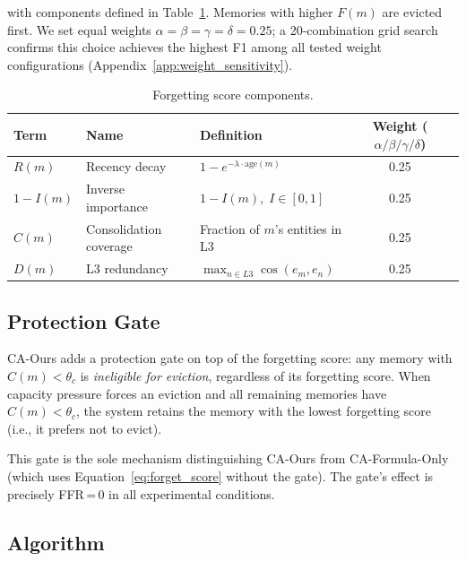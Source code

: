 \documentclass{article}
\begin{document}
with components defined in Table~\ref{tab:forgetting_components}.  Memories
with higher $F(m)$ are evicted first.  We set equal weights
$\alpha\!=\!\beta\!=\!\gamma\!=\!\delta\!=\!0.25$; a 20-combination grid
search confirms this choice achieves the highest F1 among all tested weight
configurations (Appendix~\ref{app:weight_sensitivity}).

\begin{table}[h]
\centering
\caption{Forgetting score components.}
\label{tab:forgetting_components}
\begin{tabular}{lllcc}
\toprule
Term & Name & Definition & Weight ($\alpha/\beta/\gamma/\delta$) \\
\midrule
$R(m)$ & Recency decay    & $1 - e^{-\lambda \cdot \text{age}(m)}$ & 0.25 \\
$1-I(m)$ & Inverse importance & $1 - I(m),\; I \in [0,1]$           & 0.25 \\
$C(m)$ & Consolidation coverage & Fraction of $m$'s entities in L3   & 0.25 \\
$D(m)$ & L3 redundancy  & $\max_{n \in L3} \cos(e_m, e_n)$        & 0.25 \\
\bottomrule
\end{tabular}
\end{table}

\subsection{Protection Gate}

CA-Ours adds a protection gate on top of the forgetting score: any memory
with $C(m) < \theta_c$ is \emph{ineligible for eviction}, regardless of
its forgetting score.  When capacity pressure forces an eviction and all
remaining memories have $C(m) < \theta_c$, the system retains the memory
with the lowest forgetting score (i.e., it prefers not to evict).

This gate is the sole mechanism distinguishing CA-Ours from CA-Formula-Only
(which uses Equation~\ref{eq:forget_score} without the gate).  The gate's
effect is precisely FFR\,=\,0 in all experimental conditions.

\subsection{Algorithm}
\end{document}
